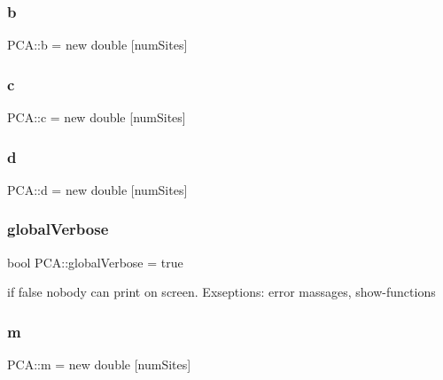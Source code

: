 \subsubsection{\texorpdfstring{b}{b}}
{\footnotesize\ttfamily P\+C\+A\+::b = new double \mbox{[}num\+Sites\mbox{]}}

\hypertarget{namespace_p_c_a_a4e2c91089d5d84755539f212ad87f02a}{}\label{namespace_p_c_a_a4e2c91089d5d84755539f212ad87f02a} 
\subsubsection{\texorpdfstring{c}{c}}
{\footnotesize\ttfamily P\+C\+A\+::c = new double \mbox{[}num\+Sites\mbox{]}}

\hypertarget{namespace_p_c_a_abf43edb3e63963e603bf8c8ce20abf94}{}\label{namespace_p_c_a_abf43edb3e63963e603bf8c8ce20abf94} 
\subsubsection{\texorpdfstring{d}{d}}
{\footnotesize\ttfamily P\+C\+A\+::d = new double \mbox{[}num\+Sites\mbox{]}}

\hypertarget{namespace_p_c_a_a01cf2b18a2d7669f5be721c2142bf67d}{}\label{namespace_p_c_a_a01cf2b18a2d7669f5be721c2142bf67d} 
\subsubsection{\texorpdfstring{global\+Verbose}{globalVerbose}}
{\footnotesize\ttfamily bool P\+C\+A\+::global\+Verbose = true}



if false nobody can print on screen. Exseptions\+: error massages, show-\/functions 

\hypertarget{namespace_p_c_a_acfc8187195fb96910fe83d4ff79b3239}{}\label{namespace_p_c_a_acfc8187195fb96910fe83d4ff79b3239} 
\subsubsection{\texorpdfstring{m}{m}}
{\footnotesize\ttfamily P\+C\+A\+::m = new double \mbox{[}num\+Sites\mbox{]}}

\hypertarget{namespace_p_c_a_a5182a7edfe31f7477e5335bc60fcf108}{}\label{namespace_p_c_a_a5182a7edfe31f7477e5335bc60fcf108} 
